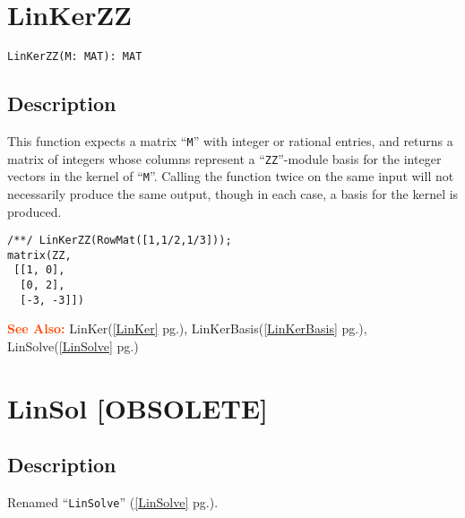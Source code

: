 \documentclass[a4paper]{mybook}
\newenvironment{command}{}{} %
\newcommand\SeeAlso{\par\textcolor{OrangeRed}{\textbf{\large See Also: }}}
\begin{document}
\section{LinKerZZ}
\label{LinKerZZ}
\begin{command} %


\begin{Verbatim}[label=syntax, rulecolor=\color{MidnightBlue},
frame=single]
LinKerZZ(M: MAT): MAT
\end{Verbatim}


\subsection*{Description}

This function expects a matrix ``\verb&M&'' with integer or rational entries,
and returns a matrix of integers whose columns represent a ``\verb&ZZ&''-module
basis for the integer vectors in the kernel of ``\verb&M&''.  Calling the function
twice on the same input will not necessarily produce the same output,
though in each case, a basis for the kernel is produced.
\begin{Verbatim}[label=example, rulecolor=\color{PineGreen}, frame=single]
/**/ LinKerZZ(RowMat([1,1/2,1/3]));
matrix(ZZ,
 [[1, 0],
  [0, 2],
  [-3, -3]])
\end{Verbatim}


\SeeAlso %
  LinKer(\ref{LinKer} pg.\pageref{LinKer}), 
    LinKerBasis(\ref{LinKerBasis} pg.\pageref{LinKerBasis}), 
    LinSolve(\ref{LinSolve} pg.\pageref{LinSolve})
\end{command} %

\section{LinSol [OBSOLETE]}
\label{LinSol [OBSOLETE]}
\begin{command} %



\subsection*{Description}

Renamed ``\verb&LinSolve&'' (\ref{LinSolve} pg.\pageref{LinSolve}).

\end{command} %
\end{document}
